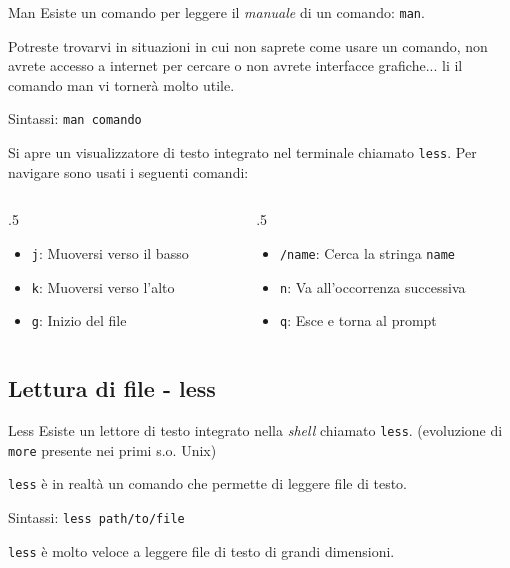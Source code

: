 \begin{frame}{Man}
  Esiste un comando per leggere il \textit{manuale} di un comando: 
  \texttt{man}.\bigskip

  Potreste trovarvi in situazioni in cui non saprete come usare un comando,
  non avrete accesso a internet per cercare o non avrete interfacce grafiche...
  li il comando man vi tornerà molto utile.\bigskip

  Sintassi: \texttt{man comando}\bigskip

  Si apre un visualizzatore di testo integrato nel terminale chiamato \texttt{less}.
  Per navigare sono usati i seguenti comandi:
  \begin{columns}[T] %
    \begin{column}{.5\textwidth} %
      \begin{itemize}
        \item \texttt{j}: Muoversi verso il basso
        \item \texttt{k}: Muoversi verso l'alto
        \item \texttt{g}: Inizio del file
      \end{itemize}
    \end{column}
    \begin{column}{.5\textwidth} %
      \begin{itemize}
        \item \texttt{/name}: Cerca la stringa \texttt{name}
        \item \texttt{n}: Va all'occorrenza successiva
        \item \texttt{q}: Esce e torna al prompt
      \end{itemize}
    \end{column}
  \end{columns}
\end{frame}

\subsection{Lettura di file - less}
\begin{frame}{Less}
  Esiste un lettore di testo integrato nella \textit{shell} chiamato 
  \texttt{less}. (evoluzione di \texttt{more} presente nei primi s.o. Unix)\bigskip

  \texttt{less} è in realtà un comando che permette di leggere file di 
  testo.\bigskip

  Sintassi: \texttt{less path/to/file}\bigskip

  \texttt{less} è molto veloce a leggere file di testo di grandi dimensioni.
\end{frame}

